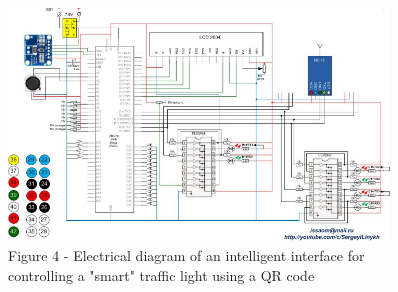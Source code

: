 \begin{figure}[H]
	\centering
	\includegraphics[width=0.9\textwidth]{media/ict/image8}
	\caption*{Figure 4 - Electrical diagram of an intelligent interface for
controlling a "smart" traffic light using a QR code}
\end{figure}


